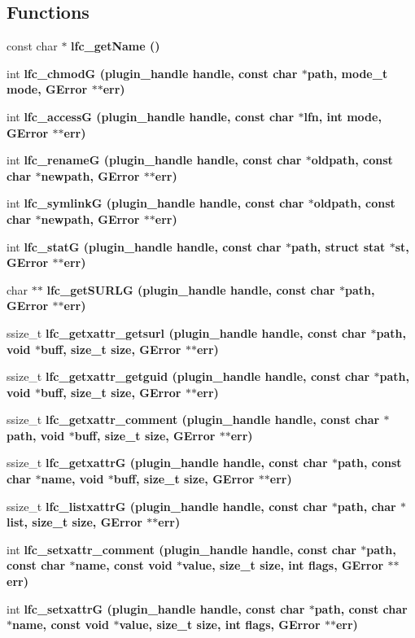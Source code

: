 \subsection*{Functions}
\begin{CompactItemize}
\item 
const char $\ast$ \bf{lfc\_\-get\-Name} ()
\item 
int \bf{lfc\_\-chmod\-G} (plugin\_\-handle handle, const char $\ast$path, mode\_\-t mode, GError $\ast$$\ast$err)
\item 
int \bf{lfc\_\-access\-G} (plugin\_\-handle handle, const char $\ast$lfn, int mode, GError $\ast$$\ast$err)
\item 
int \bf{lfc\_\-rename\-G} (plugin\_\-handle handle, const char $\ast$oldpath, const char $\ast$newpath, GError $\ast$$\ast$err)
\item 
int \bf{lfc\_\-symlink\-G} (plugin\_\-handle handle, const char $\ast$oldpath, const char $\ast$newpath, GError $\ast$$\ast$err)
\item 
int \bf{lfc\_\-stat\-G} (plugin\_\-handle handle, const char $\ast$path, struct stat $\ast$st, GError $\ast$$\ast$err)
\item 
char $\ast$$\ast$ \bf{lfc\_\-get\-SURLG} (plugin\_\-handle handle, const char $\ast$path, GError $\ast$$\ast$err)
\item 
ssize\_\-t \bf{lfc\_\-getxattr\_\-getsurl} (plugin\_\-handle handle, const char $\ast$path, void $\ast$buff, size\_\-t size, GError $\ast$$\ast$err)
\item 
ssize\_\-t \bf{lfc\_\-getxattr\_\-getguid} (plugin\_\-handle handle, const char $\ast$path, void $\ast$buff, size\_\-t size, GError $\ast$$\ast$err)
\item 
ssize\_\-t \bf{lfc\_\-getxattr\_\-comment} (plugin\_\-handle handle, const char $\ast$path, void $\ast$buff, size\_\-t size, GError $\ast$$\ast$err)
\item 
ssize\_\-t \bf{lfc\_\-getxattr\-G} (plugin\_\-handle handle, const char $\ast$path, const char $\ast$name, void $\ast$buff, size\_\-t size, GError $\ast$$\ast$err)
\item 
ssize\_\-t \bf{lfc\_\-listxattr\-G} (plugin\_\-handle handle, const char $\ast$path, char $\ast$list, size\_\-t size, GError $\ast$$\ast$err)
\item 
int \bf{lfc\_\-setxattr\_\-comment} (plugin\_\-handle handle, const char $\ast$path, const char $\ast$name, const void $\ast$value, size\_\-t size, int flags, GError $\ast$$\ast$err)
\item 
int \bf{lfc\_\-setxattr\-G} (plugin\_\-handle handle, const char $\ast$path, const char $\ast$name, const void $\ast$value, size\_\-t size, int flags, GError $\ast$$\ast$err)

\end{CompactItemize}
